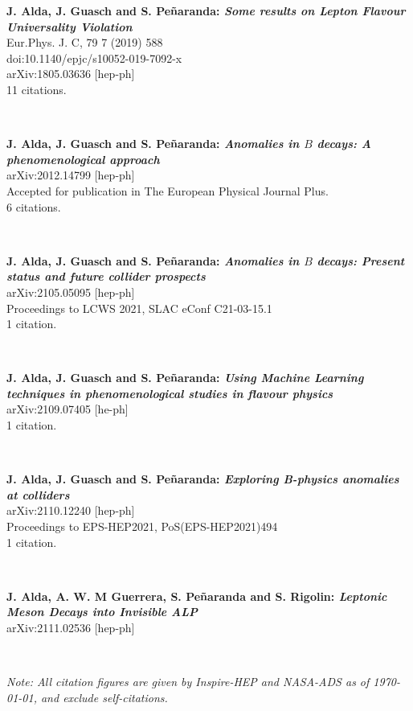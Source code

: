 \documentclass[combined.tex]{subfiles}
\begin{document}
\hspace{\parindent}
\textbf{J. Alda, J. Guasch and S. Peñaranda: \textit{Some results on Lepton Flavour Universality Violation}}\\
Eur.Phys. J. C, 79 7 (2019) 588\\
doi:10.1140/epjc/s10052-019-7092-x\\
arXiv:1805.03636 [hep-ph]\\
11 citations.

~

\textbf{J. Alda, J. Guasch and S. Peñaranda: \textit{Anomalies in $B$ decays: A phenomenological approach}}\\
arXiv:2012.14799 [hep-ph]\\
Accepted for publication in The European Physical Journal Plus.\\
6 citations.

~

\textbf{J. Alda, J. Guasch and S. Peñaranda: \textit{Anomalies in $B$ decays: Present status and future collider prospects}}\\
arXiv:2105.05095 [hep-ph]\\
Proceedings to LCWS 2021, SLAC eConf C21-03-15.1\\
1 citation.

~

\textbf{J. Alda, J. Guasch and S. Peñaranda: \textit{Using Machine Learning techniques in phenomenological studies in flavour physics}}\\
arXiv:2109.07405 [he-ph]\\
1 citation.

~

\textbf{J. Alda, J. Guasch and S. Peñaranda: \textit{Exploring B-physics anomalies at colliders}}\\
arXiv:2110.12240 [hep-ph]\\
Proceedings to EPS-HEP2021, PoS(EPS-HEP2021)494\\
1 citation.


~

\textbf{J. Alda, A. W. M Guerrera, S. Peñaranda and S. Rigolin: \textit{Leptonic Meson Decays into Invisible ALP}}\\
arXiv:2111.02536 [hep-ph]
~

~

\textit{Note: All citation figures are given by Inspire-HEP and NASA-ADS as of \today, and exclude self-citations.}
\end{document}
